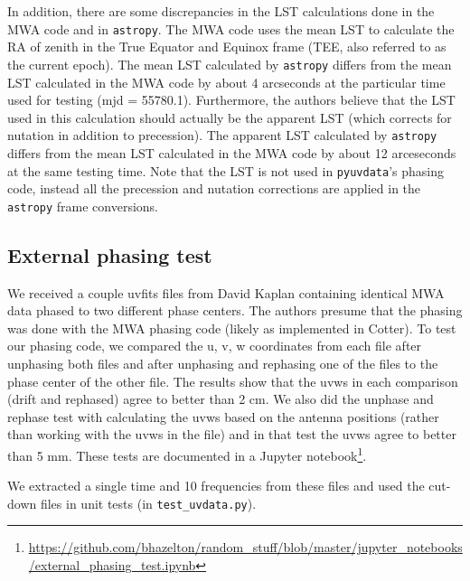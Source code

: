 \documentclass[11pt, oneside]{article}   	%
\begin{document}
In addition, there are some discrepancies in the LST calculations done in the MWA code and in \texttt{astropy}. The MWA code uses the mean LST to calculate the RA of zenith in the True Equator and Equinox frame (TEE, also referred to as the current epoch). The mean LST calculated by \texttt{astropy} differs from the mean LST calculated in the MWA code by about 4 arcseconds at the particular time used for testing (mjd = 55780.1). Furthermore, the authors believe that the LST used in this calculation should actually be the apparent LST (which corrects for nutation in addition to precession). The apparent LST calculated by \texttt{astropy} differs from the mean LST calculated in the MWA code by about 12 arceseconds at the same testing time. Note that the LST is not used in \texttt{pyuvdata}'s phasing code, instead all the precession and nutation corrections are applied in the \texttt{astropy} frame conversions.

\subsection{External phasing test}
We received a couple uvfits files from David Kaplan containing identical MWA data phased to two different phase centers. The authors presume that the phasing was done with the MWA phasing code (likely as implemented in Cotter). To test our phasing code, we compared the u, v, w coordinates from each file after unphasing both files and after unphasing and rephasing one of the files to the phase center of the other file. The results show that the uvws in each comparison (drift and rephased) agree to better than 2 cm. We also did the unphase and rephase test with calculating the uvws based on the antenna positions (rather than working with the uvws in the file) and in that test the uvws agree to better than 5 mm. These tests are documented in a Jupyter notebook\footnote{\url{https://github.com/bhazelton/random_stuff/blob/master/jupyter_notebooks/external_phasing_test.ipynb}}.

We extracted a single time and 10 frequencies from these files and used the cut-down files in unit tests (in \verb!test_uvdata.py!).
\end{document}
